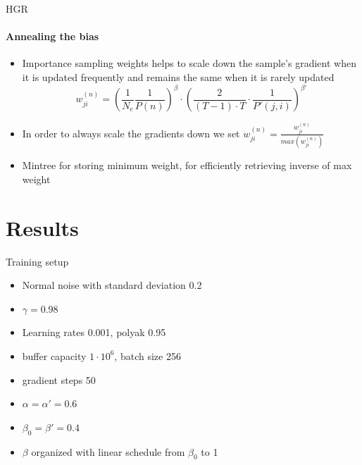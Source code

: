 \documentclass{beamer}
\begin{document}
      \begin{frame}{HGR}
            \framesubtitle{Annealing the bias}
            \begin{itemize}
                  \item Importance sampling weights helps to scale down the sample’s gradient when it is updated frequently and remains the same when it is rarely updated
                  \begin{equation}
                        w_{ji}^{(n)} = \left( \frac{1}{N_e}\frac{1}{P(n)}\right) ^{\beta} \cdot \left( \frac{2}{(T-1)\cdot T} \cdot \frac{1}{P'(j,i)}\right) ^ {\beta'}
                  \end{equation}
                  \item In order to always scale the gradients down we set $w_{ji}^{(n)} = \frac{w_{ji}^{(n)}}{max(w_{ji}^{(n)})}$
                  \item Mintree for storing minimum weight, for efficiently retrieving inverse of max weight
            \end{itemize}
            
      \end{frame}


\section{Results}

      \begin{frame}{Training setup}
            \begin{itemize}
                  \item Normal noise with standard deviation 0.2
                  \item $\gamma = 0.98$
                  \item Learning rates 0.001, polyak 0.95
                  \item buffer capacity $1\cdot 10^6$, batch size 256
                  \item gradient steps 50
                  \item $\alpha = \alpha' = 0.6$
                  \item $\beta_0 = \beta' = 0.4$
                  \item $\beta$ organized with linear schedule from $\beta_0$ to 1
            \end{itemize}
      \end{frame}
\end{document}
